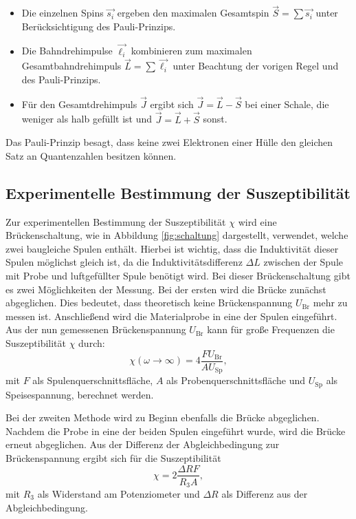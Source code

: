 \begin{itemize}
\item Die einzelnen Spins $\vec{s_i}$ ergeben den maximalen Gesamtspin $\vec{S}=\sum \vec{s_i}$
 unter Berücksichtigung des Pauli-Prinzips.
\item Die Bahndrehimpulse $\vec{\ell_i}$ kombinieren zum maximalen Gesamtbahndrehimpuls
 $\vec{L}=\sum\vec{\ell_i}$ unter Beachtung der vorigen Regel und des Pauli-Prinzips.
\item Für den Gesamtdrehimpuls $\vec{J}$ ergibt sich $\vec{J}=\vec{L}-\vec{S}$ bei einer Schale, die
weniger als halb gefüllt ist und $\vec{J}=\vec{L}+\vec{S}$ sonst.
\end{itemize}
Das Pauli-Prinzip besagt, dass keine zwei Elektronen einer Hülle den gleichen Satz an
Quantenzahlen besitzen können.

\subsection{Experimentelle Bestimmung der Suszeptibilität}
Zur experimentellen Bestimmung der Suszeptibilität $\chi$ wird eine Brückenschaltung, wie in
Abbildung \ref{fig:schaltung} dargestellt, verwendet, welche zwei baugleiche Spulen enthält.
Hierbei ist wichtig, dass die Induktivität dieser Spulen möglichst gleich ist, da die
Induktivitätsdifferenz $\Delta L$ zwischen der Spule mit Probe und luftgefüllter Spule benötigt wird.
Bei dieser Brückenschaltung gibt es zwei Möglichkeiten der Messung. Bei der ersten wird die Brücke
zunächst abgeglichen. Dies bedeutet, dass theoretisch keine Brückenspannung $U_\text{Br}$ mehr zu
messen ist. Anschließend wird die Materialprobe in eine der Spulen eingeführt. Aus der nun
gemessenen Brückenspannung $U_\text{Br}$ kann für große Frequenzen die Suszeptibilität $\chi$ durch:
\begin{equation}
\label{eqn:chiex1}
\chi(\omega \rightarrow \infty)=4\frac{F U_\text{Br}}{A U_\text{Sp}},
\end{equation}
mit $F$ als Spulenquerschnittsfläche, $A$ als Probenquerschnittsfläche und $U_\text{Sp}$ als
Speisespannung, berechnet werden.

\noindent Bei der zweiten Methode wird zu Beginn ebenfalls die Brücke abgeglichen. Nachdem die Probe
in eine der beiden Spulen eingeführt wurde, wird die Brücke erneut abgeglichen. Aus der Differenz der
Abgleichbedingung zur Brückenspannung ergibt sich für die Suszeptibilität
\begin{equation}
\label{eqn:chiex2}
\chi=2\frac{\Delta R F}{R_3 A},
\end{equation}
mit $R_3$ als Widerstand am Potenziometer und $\Delta R$ als Differenz aus der Abgleichbedingung.

